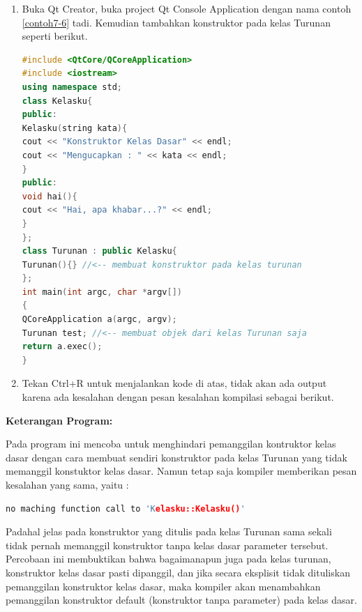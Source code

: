 \begin{enumerate}

\item
  Buka Qt Creator, buka project Qt Console Application dengan nama
  contoh \ref{contoh7-6} tadi. Kemudian tambahkan konstruktor pada kelas Turunan
  seperti berikut.

\begin{lstlisting}[language=c++, caption=Konstruktor kelas turunan harus memanggil salah satu konstruktor kelas dasar, label=contoh7-6]
#include <QtCore/QCoreApplication>
#include <iostream>
using namespace std;
class Kelasku{
public:
Kelasku(string kata){
cout << "Konstruktor Kelas Dasar" << endl;
cout << "Mengucapkan : " << kata << endl;
}
public:
void hai(){
cout << "Hai, apa khabar...?" << endl;
}
};
class Turunan : public Kelasku{
Turunan(){} //<-- membuat konstruktor pada kelas turunan
};
int main(int argc, char *argv[])
{
QCoreApplication a(argc, argv);
Turunan test; //<-- membuat objek dari kelas Turunan saja
return a.exec();
}
\end{lstlisting}
\item
  Tekan Ctrl+R untuk menjalankan kode di atas, tidak akan ada output
  karena ada kesalahan dengan pesan kesalahan kompilasi sebagai berikut.
  
  \begin{figure}[htbp]
  	\centering
{}
  	
  \end{figure}
\end{enumerate}



\textbf{Keterangan Program:}

Pada program ini mencoba untuk menghindari pemanggilan kontruktor kelas
dasar dengan cara membuat sendiri konstruktor pada kelas Turunan yang
tidak memanggil konstuktor kelas dasar. Namun tetap saja kompiler
memberikan pesan kesalahan yang sama, yaitu :

\begin{lstlisting}[language=c++, numbers=none]
no maching function call to 'Kelasku::Kelasku()' 
\end{lstlisting}

Padahal jelas pada konstruktor yang ditulis pada kelas Turunan sama
sekali tidak pernah memanggil konstruktor tanpa kelas dasar parameter
tersebut. Percobaan ini membuktikan bahwa bagaimanapun juga pada kelas
turunan, konstruktor kelas dasar pasti dipanggil, dan jika secara
eksplisit tidak dituliskan pemanggilan konstruktor kelas dasar, maka
kompiler akan menambahkan pemanggilan konstruktor default (konstruktor
tanpa parameter) pada kelas dasar.

